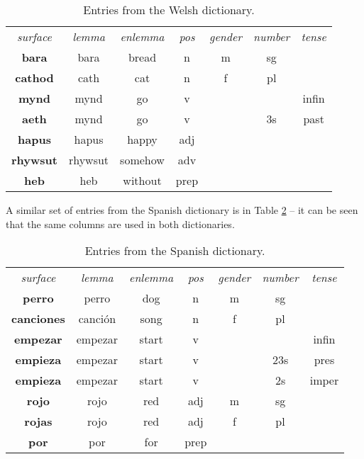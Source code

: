 \documentclass[11pt]{article}
\begin{document}
\begin{table}[!hbtp]
\centering
\begin{scriptsize}
\begin{tabular}{ccccccc}
\textit{surface} & \textit{lemma} & \textit{enlemma} & \textit{pos} & \textit{gender} & \textit{number} & \textit{tense} \\
\textbf{bara} & bara & bread & n & m & sg & \\
\textbf{cathod} & cath & cat & n & f & pl & \\
\textbf{mynd} & mynd & go & v & & & infin \\
\textbf{aeth} & mynd & go & v & & 3s & past \\
\textbf{hapus} & hapus & happy & adj & &  & \\
\textbf{rhywsut} & rhywsut & somehow & adv & & & \\
\textbf{heb} & heb & without & prep & & & \\
\end{tabular}
\end{scriptsize}
\caption{Entries from the Welsh dictionary.}
\label{welsh_dict}
\end{table}

A similar set of entries from the Spanish dictionary is in Table \ref{spanish_dict} -- it can be seen that the same columns are used in both dictionaries.

\begin{table}[!hbtp]
\centering
\begin{scriptsize}
\begin{tabular}{ccccccc}
\textit{surface} & \textit{lemma} & \textit{enlemma} & \textit{pos} & \textit{gender} & \textit{number} & \textit{tense} \\
\textbf{perro} & perro & dog & n & m & sg & \\
\textbf{canciones} & canción & song & n & f & pl & \\
\textbf{empezar} & empezar & start & v & & & infin \\
\textbf{empieza} & empezar & start & v & & 23s & pres \\
\textbf{empieza} & empezar & start & v & & 2s & imper \\
\textbf{rojo} & rojo & red & adj & m & sg & \\
\textbf{rojas} & rojo & red & adj & f & pl & \\
\textbf{por} & por & for & prep & & & \\
\end{tabular}
\end{scriptsize}
\caption{Entries from the Spanish dictionary.}
\label{spanish_dict}
\end{table}
\end{document}
